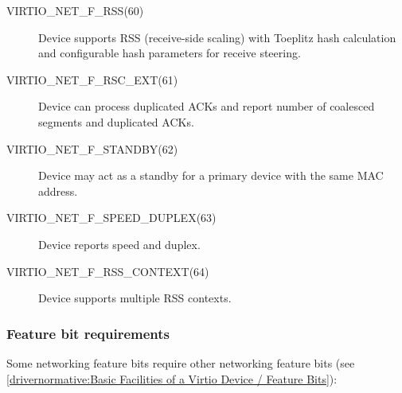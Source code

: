\begin{description}
\item[VIRTIO_NET_F_RSS(60)] Device supports RSS (receive-side scaling)
    with Toeplitz hash calculation and configurable hash
    parameters for receive steering.

\item[VIRTIO_NET_F_RSC_EXT(61)] Device can process duplicated ACKs
    and report number of coalesced segments and duplicated ACKs.

\item[VIRTIO_NET_F_STANDBY(62)] Device may act as a standby for a primary
    device with the same MAC address.

\item[VIRTIO_NET_F_SPEED_DUPLEX(63)] Device reports speed and duplex.

\item[VIRTIO_NET_F_RSS_CONTEXT(64)] Device supports multiple RSS contexts.
\end{description}

\subsubsection{Feature bit requirements}\label{sec:Device Types / Network Device / Feature bits / Feature bit requirements}

Some networking feature bits require other networking feature bits
(see \ref{drivernormative:Basic Facilities of a Virtio Device / Feature Bits}):

